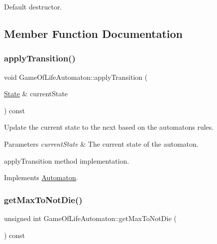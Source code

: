 Default destructor. 

\subsection{Member Function Documentation}
\mbox{\label{class_game_of_life_automaton_ac806423a9e936950e2dabd6989575f1e}} 
\subsubsection{\texorpdfstring{apply\+Transition()}{applyTransition()}}
{\footnotesize\ttfamily void Game\+Of\+Life\+Automaton\+::apply\+Transition (\begin{DoxyParamCaption}\item[{\mbox{\hyperlink{class_state}{State}} \&}]{current\+State }\end{DoxyParamCaption}) const\hspace{0.3cm}{\ttfamily [virtual]}}

Update the current state to the next based on the automaton\textquotesingle{}s rules.


\begin{DoxyParams}{Parameters}
{\em current\+State} & The current state of the automaton.\\
\hline
\end{DoxyParams}
apply\+Transition method implementation. 

Implements \mbox{\hyperlink{class_automaton_aaf6b5ebd7a820867bfaab0f6892cc0b8}{Automaton}}.

\mbox{\label{class_game_of_life_automaton_afe6b71a259b440f172ca8428af92f9ec}} 
\subsubsection{\texorpdfstring{get\+Max\+To\+Not\+Die()}{getMaxToNotDie()}}
{\footnotesize\ttfamily unsigned int Game\+Of\+Life\+Automaton\+::get\+Max\+To\+Not\+Die (\begin{DoxyParamCaption}{ }\end{DoxyParamCaption}) const\hspace{0.3cm}{\ttfamily [inline]}}

